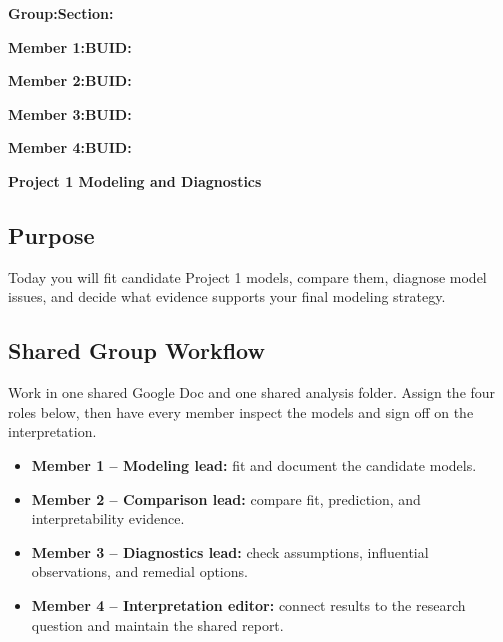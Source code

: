\documentclass{article}
\newcommand{\projecttitle}{Project 1 Modeling and Diagnostics}
\newcommand{\blankline}{\underline{\phantom{XXXXXXXXXXXXXXXXXXXXXXXX}}}
\newcommand{\blankid}{\underline{\phantom{XXXXXXXXXXXXXXX}}}
\begin{document}
\noindent\textbf{Group:}\blankline{}\hfill\textbf{Section:}\blankid{}

\medskip
\noindent\textbf{Member 1:}\blankline{}\hfill\textbf{BUID:}\blankid{}

\medskip
\noindent\textbf{Member 2:}\blankline{}\hfill\textbf{BUID:}\blankid{}

\medskip
\noindent\textbf{Member 3:}\blankline{}\hfill\textbf{BUID:}\blankid{}

\medskip
\noindent\textbf{Member 4:}\blankline{}\hfill\textbf{BUID:}\blankid{}

\begin{center}
  {\Large \textbf{\projecttitle{}}}
\end{center}

\subsection*{Purpose}
Today you will fit candidate Project 1 models, compare them, diagnose model issues, and decide what evidence supports your final modeling strategy.

\subsection*{Shared Group Workflow}
Work in one shared Google Doc and one shared analysis folder. Assign the four roles below, then have every member inspect the models and sign off on the interpretation.
\begin{itemize}[itemsep=.25em]
  \item \textbf{Member 1 -- Modeling lead:} fit and document the candidate models.
  \item \textbf{Member 2 -- Comparison lead:} compare fit, prediction, and interpretability evidence.
  \item \textbf{Member 3 -- Diagnostics lead:} check assumptions, influential observations, and remedial options.
  \item \textbf{Member 4 -- Interpretation editor:} connect results to the research question and maintain the shared report.
\end{itemize}
\end{document}
